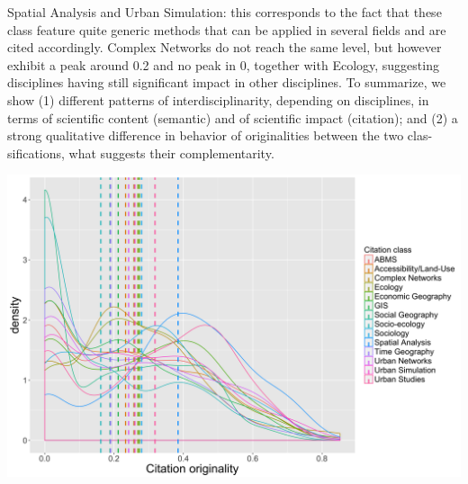 {Spatial Analysis and Urban Simulation: this corresponds to the fact that these class feature quite generic methods that can be applied in several fields and are cited accordingly. Complex Networks do not reach the same level, but however exhibit a peak around 0.2 and no peak in 0, together with Ecology, suggesting disciplines having still significant impact in other disciplines. To summarize, we show (1) different patterns of interdisciplinarity, depending on disciplines, in terms of scientific content (semantic) and of scientific impact (citation); and (2) a strong qualitative difference in behavior of originalities between the two clas- sifications, what suggests their complementarity.


\begin{center}
\includegraphics[width=0.8\linewidth]{figures/citation_originalities_citclass.png}
\end{center}

}
